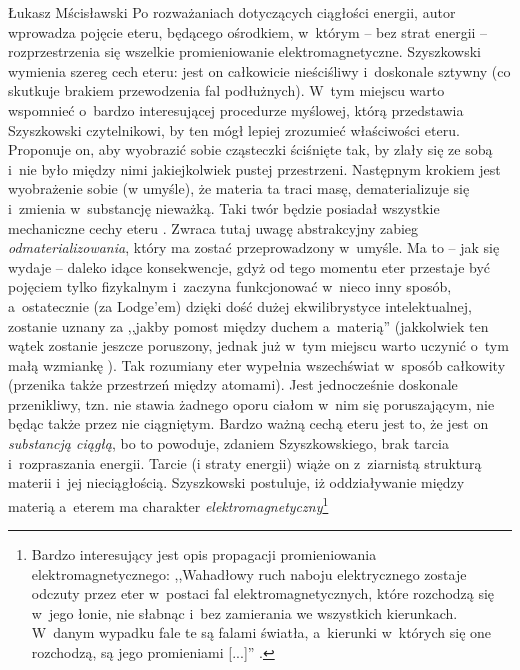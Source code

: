 \begin{artplenv}{Łukasz Mścisławski}
Po rozważaniach dotyczących ciągłości energii, autor wprowadza pojęcie eteru, będącego ośrodkiem, w~którym -- bez strat energii -- rozprzestrzenia się wszelkie promieniowanie elektromagnetyczne. Szyszkowski wymienia szereg cech eteru: jest on całkowicie nieściśliwy i~doskonale sztywny (co skutkuje brakiem przewodzenia fal podłużnych). W~tym miejscu warto wspomnieć o~bardzo interesującej procedurze myślowej, którą przedstawia Szyszkowski czytelnikowi, by ten mógł lepiej zrozumieć właściwości eteru. Proponuje on, aby wyobrazić sobie cząsteczki ściśnięte tak, by zlały się ze sobą i~nie było między nimi jakiejkolwiek pustej przestrzeni. Następnym krokiem jest wyobrażenie sobie (w umyśle), że materia ta traci masę, dematerializuje się i~zmienia w~substancję nieważką. Taki twór będzie posiadał wszystkie mechaniczne cechy eteru
\parencite[por.][s.~50]{szyszkowski_o_1916}. %
 Zwraca tutaj uwagę abstrakcyjny zabieg \textit{odmaterializowania}, który ma zostać przeprowadzony w~umyśle. Ma to -- jak się wydaje -- daleko idące konsekwencje, gdyż od tego momentu eter przestaje być pojęciem tylko fizykalnym i~zaczyna funkcjonować w~nieco inny sposób, a~ostatecznie (za Lodge'em) dzięki dość dużej ekwilibrystyce intelektualnej, zostanie uznany za ,,jakby pomost między duchem a~materią'' (jakkolwiek ten wątek zostanie jeszcze poruszony, jednak już w~tym miejscu warto uczynić o~tym małą wzmiankę 
\parencite[por.][s.~55]{szyszkowski_o_1916}%
). Tak rozumiany eter wypełnia wszechświat w~sposób całkowity (przenika także przestrzeń między atomami). Jest jednocześnie doskonale przenikliwy, tzn. nie stawia żadnego oporu ciałom w~nim się poruszającym, nie będąc także przez nie ciągniętym. Bardzo ważną cechą eteru jest to, że jest on \textit{substancją ciągłą}, bo to powoduje, zdaniem Szyszkowskiego, brak tarcia i~rozpraszania energii. Tarcie (i straty energii) wiąże on z~ziarnistą strukturą materii i~jej nieciągłością. Szyszkowski postuluje, iż oddziaływanie między materią a~eterem ma charakter \textit{elektromagnetyczny}\footnote{Bardzo interesujący jest opis propagacji promieniowania elektromagnetycznego: ,,Wahadłowy ruch naboju elektrycznego zostaje odczuty przez eter w~postaci fal elektromagnetycznych, które rozchodzą się w~jego łonie, nie słabnąc i~bez zamierania we wszystkich kierunkach. W~danym wypadku fale te są falami światła, a~kierunki w~których się one rozchodzą, są jego promieniami [...]'' 
\parencite[][s.~51]{szyszkowski_o_1916}.%
}
\end{artplenv}
